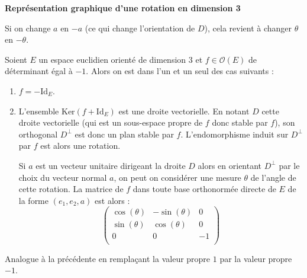 \documentclass[a4paper,10pt]{report}
\begin{document}
\medskip

\begin{center}
\textbf{Représentation graphique d'une rotation en dimension 3}
\end{center}

\vspace{5cm}

%
%
%

\vspace{4cm}
\begin{rem} Si on change $a$ en $-a$ (ce qui change l'orientation de $D$), cela revient à changer $\theta$ en $- \theta$.
\end{rem}

\begin{thm}[Admis] Soient $E$ un espace euclidien orienté de dimension $3$ et $f \in \mathcal{O}(E)$ de déterminant égal à $-1$. Alors on est dans l'un et un seul des cas suivants :
\begin{enumerate}
\item $f= -\textrm{Id}_E$.
\item L'ensemble $\textrm{Ker}(f +\textrm{Id}_E)$ est une droite vectorielle. En notant $D$ cette droite vectorielle (qui est un sous-espace propre de $f$ donc stable par $f$), son orthogonal $D^{\perp}$ est donc un plan stable par $f$. L'endomorphisme induit sur $D^{\perp}$ par $f$ est alors une rotation.

\medskip

\noindent Si $a$ est un vecteur unitaire dirigeant la droite $D$ alors en orientant $D^{\perp}$ par le choix du vecteur normal $a$, on peut on considérer une mesure $\theta$ de l'angle de cette rotation. La matrice de $f$ dans toute base orthonormée directe de $E$ de la forme $(e_1,e_2,a)$ est alors :
$$ \begin{pmatrix}
\cos(\theta) & -\sin(\theta) & 0 \\
\sin(\theta) & \cos(\theta) & 0 \\
0 & 0 &- 1 \\
\end{pmatrix}$$
\end{enumerate}
\end{thm}

\begin{preuve} Analogue à la précédente en remplaçant la valeur propre $1$ par la valeur propre $-1$.
\end{preuve}
\end{document}
